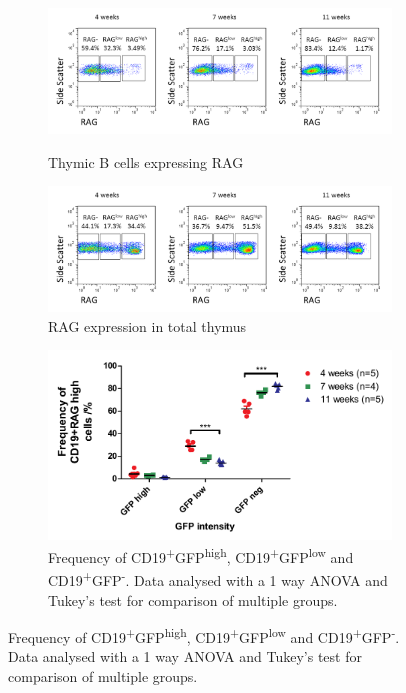 \begin{figure}
	\begin{subfigure}{\textwidth}
	\includegraphics[width=\textwidth]{Figures/RAGhighlownegthyB.png}
	\caption{Thymic B cells expressing RAG}
	\label{subfig:RAGhighlownegthyB}
	\includegraphics[width=\textwidth]{Figures/RAGhighlownegtotalthy.png}
	\caption{RAG expression in total thymus}
	\end{subfigure}
	\begin{subfigure}{\textwidth}
	\includegraphics[width=\textwidth]{Figures/RAGhighlownegative.pdf}
	\caption{Frequency of CD19\textsuperscript{+}GFP\textsuperscript{high}, CD19\textsuperscript{+}GFP\textsuperscript{low} and CD19\textsuperscript{+}GFP\textsuperscript{-}. Data analysed with a 1 way ANOVA and Tukey's test for comparison of multiple groups.}
	\label{subfig:RAGhighlowneggraph}
	\end{subfigure}

\end{figure}
